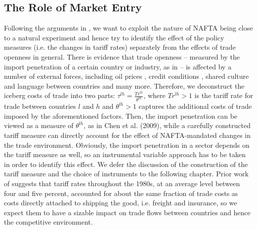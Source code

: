 \documentclass[a4paper,12pt]{article}
\begin{document}
\subsection{The Role of Market Entry}
Following the arguments in \citet{Trefler2004}, we want to exploit the nature of NAFTA being close to a natural experiment and hence try to identify the effect of the policy measures (i.e. the changes in tariff rates) separately from the effects of trade openness in general. There is evidence that trade openness -- measured by the import penetration of a certain country or industry, as in \citet{Chen2009} -- is affected by a number of external forces, including oil prices \citep{Kilian2009}, credit conditions \citep{Chor2012}, shared culture and language between countries and many more. Therefore, we deconstruct the iceberg costs of trade into two parts: $\tau^{lh}=\frac{Tr^{lh}}{\theta^{lh}}$, where $Tr^{lh}>1$ is the tariff rate for trade between countries $l$ and $h$ and $\theta^{lh}>1$ captures the additional costs of trade imposed by the aforementioned factors. Then, the import penetration can be viewed as a measure of $\theta^{lh}$, as in Chen et al. (2009), while a carefully constructed tariff measure can directly account for the effect of NAFTA-mandated changes in the trade environment. Obviously, the import penetration in a sector depends on the tariff measure as well, so an instrumental variable approach has to be taken in order to identify this effect. We defer the discussion of the construction of the tariff measure and the choice of instruments to the following chapter. Prior work of \citet{Bernard2006} suggests that tariff rates throughout the 1980s, at an average level between four and five percent, accounted for about the same fraction of trade costs as costs directly attached to shipping the good, i.e. freight and insurance, so we expect them to have a sizable impact on trade flows between countries and hence the competitive environment. \vspace{0.5cm} \\
\end{document}
